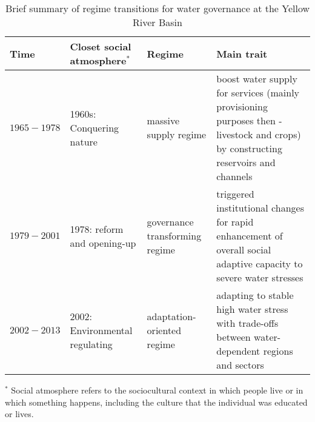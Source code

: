 \begin{table}[htbp]
    \centering
    \caption{Brief summary of regime transitions for water governance at the Yellow River Basin}
      \begin{tabularx}{\textwidth}{p{} p{} p{} p{}}
      \toprule
      Time  & Closet social atmosphere$^*$ & Regime & Main trait \\
      \midrule
      $1965-1978$ & 1960s: Conquering nature & massive supply regime & boost water supply for services (mainly provisioning purposes then -livestock and crops) by constructing reservoirs and channels \\
      $1979-2001$ & 1978: reform and opening-up & governance transforming regime & triggered institutional changes for rapid enhancement of overall social adaptive capacity to severe water stresses \\
      $2002-2013$ & 2002: Environmental regulating & adaptation-oriented regime & adapting to stable high water stress with trade-offs between water-dependent regions and sectors \\
      \bottomrule
      \end{tabularx}\label{tab:regimes}%

      \footnotesize
      $^*$ Social atmosphere refers to the sociocultural context in which people live or in which something happens, including the culture that the individual was educated or lives.
  \end{table}%
